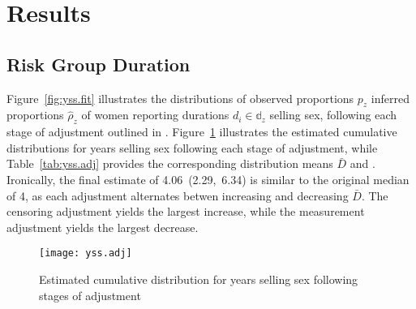 \section{Results}
\subsection{Risk Group Duration}\label{res.yss}
Figure~\ref{fig:yss.fit} illustrates the distributions of
observed proportions $p_z$ \vs inferred proportions $\hat{\rho}_z$ of women
reporting durations $d_i \in \mathbb{d}_z$ selling sex,
following each stage of adjustment outlined in .
Figure~\ref{fig:yss.adj} illustrates
the estimated cumulative distributions for years selling sex following each stage of adjustment,
while Table~\ref{tab:yss.adj} provides the corresponding distribution means $\bar{D}$ and \ci.
Ironically, the final estimate of 4.06~(2.29,~6.34) is similar to the original median of 4,
as each adjustment alternates betwen increasing and decreasing $\bar{D}$.
The censoring adjustment yields the largest increase, while
the measurement adjustment yields the largest decrease.
\begin{figure}[h]
  \centering\texttt{[image: yss.adj]}
  \caption{Estimated cumulative distribution for years selling sex
    following stages of adjustment}
  \label{fig:yss.adj}
\end{figure}

